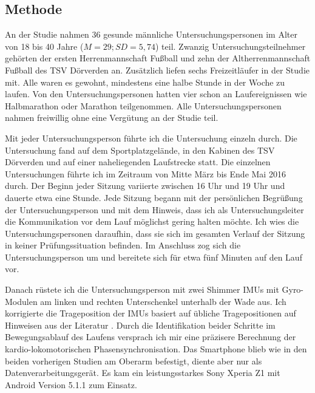 \subsection{Methode} 

\label{sub:methode_5_3}

An der Studie nahmen 36 gesunde männliche Untersuchungspersonen im Alter von 18 bis 40 Jahre ($M = 29; SD = 5{,}74$) teil. Zwanzig Untersuchungsteilnehmer gehörten der ersten Herrenmannschaft Fußball und zehn der Altherrenmannschaft Fußball des TSV Dörverden an. Zusätzlich liefen sechs Freizeitläufer in der Studie mit. Alle waren es gewohnt, mindestens eine halbe Stunde in der Woche zu laufen. Von den Untersuchungspersonen hatten vier schon an Laufereignissen wie Halbmarathon oder Marathon teilgenommen. Alle Untersuchungspersonen nahmen freiwillig ohne eine Vergütung an der Studie teil. 

Mit jeder Untersuchungsperson führte ich die Untersuchung einzeln durch. Die Untersuchung fand auf dem Sportplatzgelände, in den Kabinen des TSV Dörverden und auf einer naheliegenden Laufstrecke statt. Die einzelnen Untersuchungen führte ich im Zeitraum von Mitte März bis Ende Mai 2016 durch. Der Beginn jeder Sitzung variierte zwischen 16 Uhr und 19 Uhr und dauerte etwa eine Stunde. Jede Sitzung begann mit der persönlichen Begrüßung der Untersuchungsperson und mit dem Hinweis, dass ich als Untersuchungsleiter die Kommunikation vor dem Lauf möglichst gering halten möchte. Ich wies die Untersuchungspersonen daraufhin, dass sie sich im gesamten Verlauf der Sitzung in keiner Prüfungssituation befinden. Im Anschluss zog sich die Untersuchungsperson um und bereitete sich für etwa fünf Minuten auf den Lauf vor. 

Danach rüstete ich die Untersuchungsperson mit zwei Shimmer \acp{IMU} mit Gyro-Modulen am linken und rechten Unterschenkel unterhalb der Wade aus. Ich korrigierte die Trageposition der \acp{IMU} basiert auf übliche Tragepositionen auf Hinweisen aus der Literatur \citep{Hreljac1993}. Durch die Identifikation beider Schritte im Bewegungsablauf des Laufens versprach ich mir eine präzisere Berechnung der kardio-lokomotorischen Phasensynchronisation. Das Smartphone blieb wie in den beiden vorherigen Studien am Oberarm befestigt, diente aber nur als Datenverarbeitungsgerät. Es kam ein leistungsstarkes Sony Xperia Z1 mit Android Version 5.1.1 zum Einsatz.

